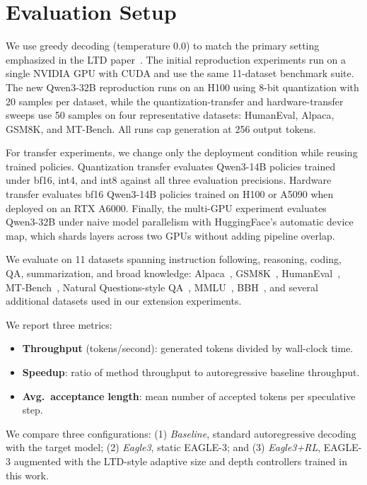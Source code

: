 \documentclass[letterpaper,twocolumn,10pt]{article}
\newenvironment{denseitemize}{
\begin{itemize}[topsep=2.5pt, partopsep=0pt, leftmargin=1.5em]
  \setlength{\itemsep}{2.5pt}
  \setlength{\parskip}{0pt}
  \setlength{\parsep}{0pt}
}{\end{itemize}}
\begin{document}
\section{Evaluation Setup}

We use greedy decoding (temperature 0.0) to match the primary setting emphasized in the LTD paper~\cite{ltd2025}. The initial reproduction experiments run on a single NVIDIA GPU with CUDA and use the same 11-dataset benchmark suite. The new Qwen3-32B reproduction runs on an H100 using 8-bit quantization with 20 samples per dataset, while the quantization-transfer and hardware-transfer sweeps use 50 samples on four representative datasets: HumanEval, Alpaca, GSM8K, and MT-Bench. All runs cap generation at 256 output tokens.

For transfer experiments, we change only the deployment condition while reusing trained policies. Quantization transfer evaluates Qwen3-14B policies trained under bf16, int4, and int8 against all three evaluation precisions. Hardware transfer evaluates bf16 Qwen3-14B policies trained on H100 or A5090 when deployed on an RTX A6000. Finally, the multi-GPU experiment evaluates Qwen3-32B under naive model parallelism with HuggingFace's automatic device map, which shards layers across two GPUs without adding pipeline overlap.

We evaluate on 11 datasets spanning instruction following, reasoning, coding, QA, summarization, and broad knowledge: Alpaca~\cite{taori2023alpaca}, GSM8K~\cite{cobbe2021gsm8k}, HumanEval~\cite{chen2021humaneval}, MT-Bench~\cite{zheng2023mtbench}, Natural Questions-style QA~\cite{kwiatkowski2019natural}, MMLU~\cite{hendrycks2020mmlu}, BBH~\cite{srivastava2023bbh}, and several additional datasets used in our extension experiments.

We report three metrics:
\begin{denseitemize}
  \item \textbf{Throughput} (tokens/second): generated tokens divided by wall-clock time.
  \item \textbf{Speedup}: ratio of method throughput to autoregressive baseline throughput.
  \item \textbf{Avg.\ acceptance length}: mean number of accepted tokens per speculative step.
\end{denseitemize}

We compare three configurations: (1) \emph{Baseline}, standard autoregressive decoding with the target model; (2) \emph{Eagle3}, static EAGLE-3; and (3) \emph{Eagle3+RL}, EAGLE-3 augmented with the LTD-style adaptive size and depth controllers trained in this work.
\end{document}
